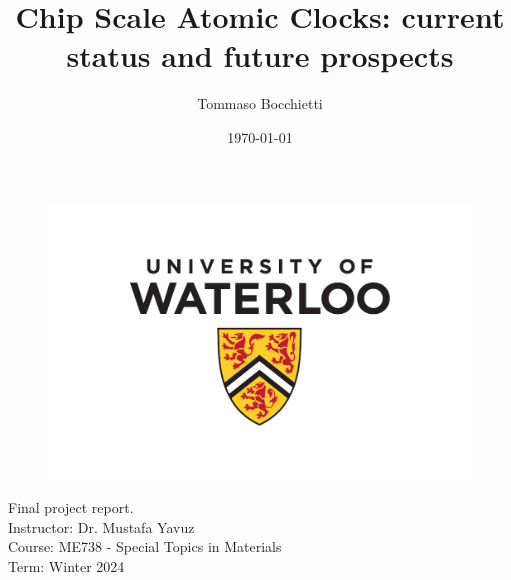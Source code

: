 \documentclass[12pt]{assignment}
\title{Chip Scale Atomic Clocks: current status and future prospects}
\author{Tommaso Bocchietti}
\date{\today}
\begin{document}
\maketitle

\begin{figure}[H]
    \centering
    \includegraphics[width=.9\textwidth]{./pdf/UniversityOfWaterloo_logo_vert_pms}
    \label{fig:University_Of_Waterloo_logo}
\end{figure}

\vspace*{\fill}

Final project report. \\

Instructor: Dr. Mustafa Yavuz \\
Course: ME738 - Special Topics in Materials \\
Term: Winter 2024 \\

\clearpage


\clearpage
\tableofcontents

\clearpage
\listoffigures
\listoftables

\clearpage








\clearpage
\nocite{*}


\clearpage
\appendix
\label{appendix}


\end{document}
